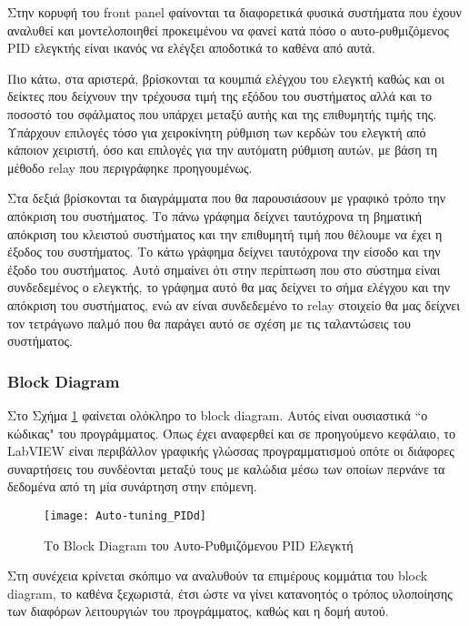 Στην κορυφή του front panel φαίνονται τα διαφορετικά φυσικά συστήματα που έχουν αναλυθεί και μοντελοποιηθεί προκειμένου να φανεί κατά πόσο ο αυτο-ρυθμιζόμενος PID ελεγκτής είναι ικανός να ελέγξει αποδοτικά το καθένα από αυτά.

Πιο κάτω, στα αριστερά, βρίσκονται τα κουμπιά ελέγχου του ελεγκτή καθώς και οι δείκτες που δείχνουν την τρέχουσα τιμή της εξόδου του συστήματος αλλά και το ποσοστό του σφάλματος που υπάρχει μεταξύ αυτής και της επιθυμητής τιμής της. Υπάρχουν επιλογές τόσο για χειροκίνητη ρύθμιση των κερδών του ελεγκτή από κάποιον χειριστή, όσο και επιλογές για την αυτόματη ρύθμιση αυτών, με βάση τη μέθοδο relay που περιγράφηκε προηγουμένως.

Στα δεξιά βρίσκονται τα διαγράμματα που θα παρουσιάσουν με γραφικό τρόπο την απόκριση του συστήματος. Το πάνω γράφημα δείχνει ταυτόχρονα τη βηματική απόκριση του κλειστού συστήματος και την επιθυμητή τιμή που θέλουμε να έχει η έξοδος του συστήματος. Το κάτω γράφημα δείχνει ταυτόχρονα την είσοδο και την έξοδο του συστήματος. Αυτό σημαίνει ότι στην περίπτωση που στο σύστημα είναι συνδεδεμένος ο ελεγκτής, το γράφημα αυτό θα μας δείχνει το σήμα ελέγχου και την απόκριση του συστήματος, ενώ αν είναι συνδεδεμένο το relay στοιχείο θα μας δείχνει τον τετράγωνο παλμό που θα παράγει αυτό σε σχέση με τις ταλαντώσεις του συστήματος.

\subsubsection{Block Diagram}

Στο Σχήμα \ref{fig:Auto-tuning_PIDd} φαίνεται ολόκληρο το block diagram. Αυτός είναι ουσιαστικά ``ο κώδικας" του προγράμματος. Όπως έχει αναφερθεί και σε προηγούμενο κεφάλαιο, το LabVIEW είναι περιβάλλον γραφικής γλώσσας προγραμματισμού οπότε οι διάφορες συναρτήσεις του συνδέονται μεταξύ τους με καλώδια μέσω των οποίων περνάνε τα δεδομένα από τη μία συνάρτηση στην επόμενη. 

\begin{figure}[h]
  \centering
  \texttt{[image: Auto-tuning\_PIDd]}
  \caption{Το Block Diagram του Αυτο-Ρυθμιζόμενου PID Ελεγκτή}
  \label{fig:Auto-tuning_PIDd}
\end{figure}

Στη συνέχεια κρίνεται σκόπιμο να αναλυθούν τα επιμέρους κομμάτια του block diagram, το καθένα ξεχωριστά, έτσι ώστε να γίνει κατανοητός ο τρόπος υλοποίησης των διαφόρων λειτουργιών του προγράμματος, καθώς και η δομή αυτού. \newpage


